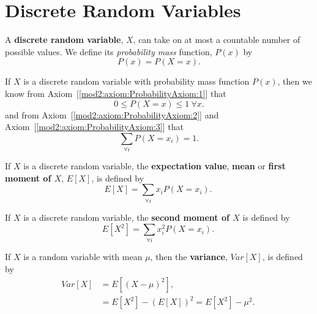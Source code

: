 \section{Discrete Random Variables} \label{mod2:section:DiscreteRandomVariables}


\begin{defn} \label{mod2:defn:DiscreteRandomVar}
	A \textbf{discrete random variable}, $X$, can take on at most a countable number of possible values. We define its \textit{probability mass} function, $P(x)$ by
	\begin{equation}
	P(x) =P(X = x).
	\end{equation}
\end{defn}

\begin{prop}\label{mod2:prop:Discrete:Properties}
	If $X$ is a discrete random variable with probability mass function $P(x)$, then we know from Axiom~[\ref{mod2:axiom:ProbabilityAxiom:1}] that
	\begin{equation}
	0 \leq P(X=x) \leq 1 \: \forall x.
	\end{equation}
	and from Axiom~[\ref{mod2:axiom:ProbabilityAxiom:2}] and Axiom~[\ref{mod2:axiom:ProbabilityAxiom:3}] that
	\begin{equation}
	\sum_{\forall i}P(X=x_i) = 1 .
	\end{equation}
\end{prop}

\begin{defn} \label{mod2:defn:Discrete:Expectation}
	If $X$ is a discrete random variable, the \textbf{expectation value}, \textbf{mean} or \textbf{first moment of $X$}, $E[X]$, is defined by
	\begin{equation}
	E[X]= \sum_{\forall i} x_i P(X=x_i). \label{mod2:eq:Discrete:Expectation}\ 
	\end{equation}
\end{defn}

\begin{defn} \label{mod2:defn:Discrete:SecondMoment}
	If $X$ is a discrete random variable, the \textbf{second moment of $X$} is defined by
	\begin{equation}
	E[X^2] = \sum_{\forall i} x_i^2 P(X=x_i). \label{mod2:eq:Discrete:SecondMoment} \ 
	\end{equation}
\end{defn}

\begin{defn}\label{mod2:defn:Discrete:Variance}
	If $X$ is a random variable with mean $\mu$, then the \textbf{variance}, $Var[X]$, is defined by
	\begin{align}
	Var[X] &= E[(X-\mu)^2],  \label{mod2:eq:Discrete:Variance:1}  \\
	&= E[X^2] - (E[X])^2  = E[X^2] - \mu^2 . \label{mod2:eq:Discrete:Variance:2} \
	\end{align}
\end{defn}



